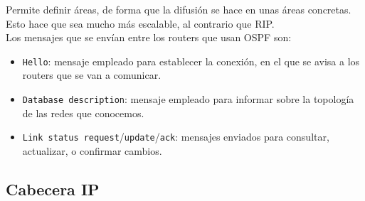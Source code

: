 Permite definir áreas, de forma que la difusión se hace en unas áreas concretas. Esto hace que sea mucho más escalable, al contrario que \acrshort{RIP}.\\

\noindent
Los mensajes que se envían entre los routers que usan \acrshort{OSPF} son:
\begin{itemize}
    \item \verb|Hello|: mensaje empleado para establecer la conexión, en el que se avisa a los routers que se van a comunicar.
    \item \verb|Database description|: mensaje empleado para informar sobre la topología de las redes que conocemos. 
    \item \verb|Link status request|/\verb|update|/\verb|ack|: mensajes enviados para consultar, actualizar, o confirmar cambios.
\end{itemize}


\subsection{Cabecera IP}


